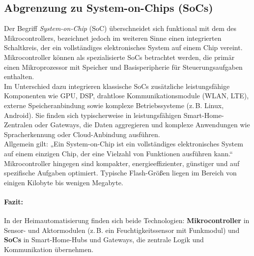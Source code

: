 \subsection*{Abgrenzung zu System-on-Chips (SoCs)}
Der Begriff \emph{System-on-Chip} (SoC) überschneidet sich funktional mit dem des Mikrocontrollers, bezeichnet jedoch im weiteren Sinne einen integrierten Schaltkreis, der ein vollständiges elektronisches System auf einem Chip vereint. Mikrocontroller können als spezialisierte SoCs betrachtet werden, die primär einen Mikroprozessor mit Speicher und Basisperipherie für Steuerungsaufgaben enthalten.
\\
Im Unterschied dazu integrieren klassische SoCs zusätzliche leistungsfähige Komponenten wie GPU, DSP, drahtlose Kommunikationsmodule (WLAN, LTE), externe Speicheranbindung sowie komplexe Betriebssysteme (z.\,B. Linux, Android). Sie finden sich typischerweise in leistungsfähigen Smart-Home-Zentralen oder Gateways, die Daten aggregieren und komplexe Anwendungen wie Spracherkennung oder Cloud-Anbindung ausführen.
\\
Allgemein gilt: „Ein System-on-Chip ist ein vollständiges elektronisches System auf einem einzigen Chip, der eine Vielzahl von Funktionen ausführen kann.“ Mikrocontroller hingegen sind kompakter, energieeffizienter, günstiger und auf spezifische Aufgaben optimiert. Typische Flash-Größen liegen im Bereich von einigen Kilobyte bis wenigen Megabyte. \autocite{SoC}
\\
\paragraph{Fazit:} In der Heimautomatisierung finden sich beide Technologien: \textbf{Mikrocontroller} in Sensor- und Aktormodulen (z.\,B. ein Feuchtigkeitssensor mit Funkmodul) und \textbf{SoCs} in Smart-Home-Hubs und Gateways, die zentrale Logik und Kommunikation übernehmen.
